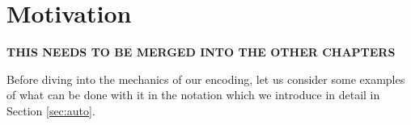 






\section{Motivation}
\label{sec:usage}

\textbf{THIS NEEDS TO BE MERGED INTO THE OTHER CHAPTERS}

Before diving into the mechanics of our encoding, let us consider some examples of what can be done with it in the notation which we introduce in detail in Section \ref{sec:auto}. %

